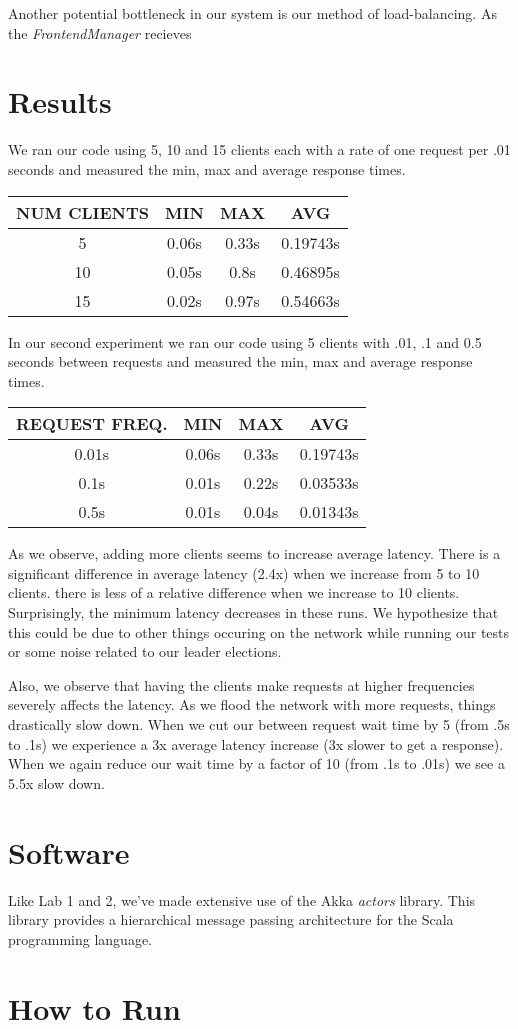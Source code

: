 \documentclass[11pt]{article}
\begin{document}
Another potential bottleneck in our system is our method of
load-balancing.  As the \emph{FrontendManager} recieves

\section{Results}
We ran our code using 5, 10 and 15 clients each with a rate of one
request per .01 seconds and measured the min, max and average response
times.

\begin{tabular}{c|c|c|c}
  NUM CLIENTS & MIN & MAX & AVG \\
  \hline
  5  & 0.06s & 0.33s & 0.19743s \\
  10 & 0.05s & 0.8s  & 0.46895s \\
  15 & 0.02s & 0.97s & 0.54663s \\
\end{tabular}

In our second experiment we ran our code using 5 clients with .01, .1
and 0.5 seconds between requests and measured the min, max and
average response times.

\begin{tabular}{c|c|c|c}
  REQUEST FREQ. & MIN & MAX & AVG \\
  \hline
  0.01s & 0.06s & 0.33s & 0.19743s \\
  0.1s  & 0.01s & 0.22s & 0.03533s \\
  0.5s  & 0.01s & 0.04s & 0.01343s \\
\end{tabular}

As we observe, adding more clients seems to increase average latency.
There is a significant difference in average latency (2.4x) when we
increase from 5 to 10 clients.  there is less of a relative difference
when we increase to 10 clients. Surprisingly, the minimum latency
decreases in these runs. We hypothesize that this could be due to
other things occuring on the network while running our tests or some
noise related to our leader elections.

Also, we observe that having the clients make requests at higher
frequencies severely affects the latency.  As we flood the network
with more requests, things drastically slow down.  When we cut our
between request wait time by 5 (from .5s to .1s) we experience a 3x
average latency increase (3x slower to get a response).  When we again
reduce our wait time by a factor of 10 (from .1s to .01s) we see a
5.5x slow down.

\section{Software}
Like Lab 1 and 2, we've made extensive use of the Akka \emph{actors}
library.  This library provides a hierarchical message passing
architecture for the Scala programming language.

\section{How to Run}
\end{document}
